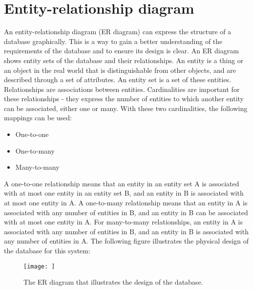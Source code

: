 \section{Entity-relationship diagram}
An entity-relationship diagram (ER diagram) can express the structure of a database graphically\cite{DBConcepts}.
This is a way to gain a better understanding of the requirements of the database and to ensure its design is clear.
An ER diagram shows entity sets of the database and their relationships.
An entity is a thing or an object in the real world that is distinguishable from other objects, and are described through a set of attributes.
An entity set is a set of these entities.
Relationships are associations between entities.
Cardinalities are important for these relationships - they express the number of entities to which another entity can be associated\cite{DBConcepts}, either one or many.
With these two cardinalities, the following mappings can be used:
\begin{itemize}
    \item One-to-one
    \item One-to-many
    \item Many-to-many
\end{itemize}
A one-to-one relationship means that an entity in an entity set A is associated with at most one entity in an entity set B, and an entity in B is associated with at most one entity in A.
A one-to-many relationship means that an entity in A is associated with any number of entities in B, and an entity in B can be associated with at most one entity in A.
For many-to-many relationships, an entity in A is associated with any number of entities in B, and an entity in B is associated with any number of entities in A\cite{DBConcepts}.
The following figure illustrates the physical design of the database for this system:

\begin{figure}[H]
    \texttt{[image: ]}
     \caption{The ER diagram that illustrates the design of the database.}
     \label{fig:er-diagram}
 \end{figure}

